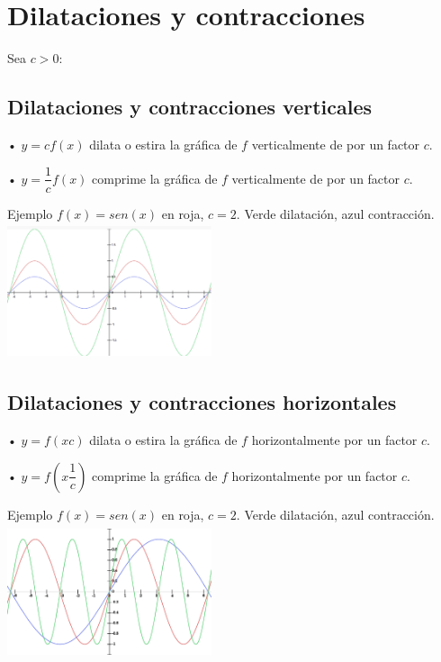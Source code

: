 \section{Dilataciones y contracciones}
Sea $c >0$:
\subsection{Dilataciones y contracciones verticales}
\hfill
\begin{minipage}{.45\textwidth}

• $y=cf(x)$ dilata o estira la gráfica de $f$ verticalmente de por un factor $c$.

• $y=\dfrac{1}{c}f(x)$ comprime la gráfica de $f$ verticalmente de por un factor $c$.
 
\end{minipage}
\hfill
\begin{minipage}{.45\textwidth}
\begin{center}
Ejemplo $f(x)=sen(x)$ en roja, $c=2$. Verde dilatación, azul contracción. 
\includegraphics[height=4cm,width=6cm]{dicover.eps} 
\end{center} 
\end{minipage}
\hfill


\subsection{Dilataciones y contracciones horizontales}



\hfill
\begin{minipage}{.45\textwidth}

• $y=f(xc)$ dilata o estira la gráfica de $f$ horizontalmente por un factor $c$.

• $y=f(x \dfrac{1}{c})$ comprime la gráfica de $f$ horizontalmente por un factor $c$.
 
\end{minipage}
\hfill
\begin{minipage}{.45\textwidth}
\begin{center}
Ejemplo $f(x)=sen(x)$ en roja, $c=2$. Verde dilatación, azul contracción. 
\includegraphics[height=4cm,width=6cm]{dicoho.eps} 
\end{center} 
\end{minipage}
\hfill


